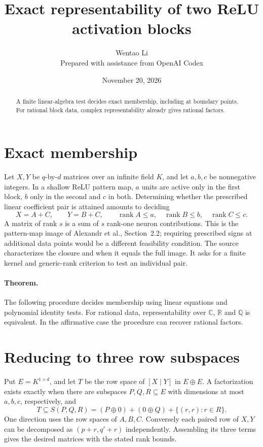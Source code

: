 \documentclass[11pt]{article}
\title{Exact representability of two ReLU activation blocks}
\author{Wentao Li\\{\small Prepared with assistance from OpenAI Codex}}
\date{November 20, 2026}
\begin{document}
\maketitle
\begin{abstract}
A finite linear-algebra test decides exact membership, including at boundary points. For rational block data, complex representability already gives rational factors.
\end{abstract}
\section*{Exact membership}
Let $X,Y$ be $q$-by-$d$ matrices over an infinite field $K$, and let $a,b,c$ be nonnegative integers. In a shallow ReLU pattern map, $a$ units are active only in the first block, $b$ only in the second and $c$ in both. Determining whether the prescribed linear coefficient pair is attained amounts to deciding
\[
 X=A+C,\qquad Y=B+C,\qquad
 \operatorname{rank} A\le a,\quad\operatorname{rank} B\le b,\quad\operatorname{rank} C\le c.
\]
A matrix of rank $s$ is a sum of $s$ rank-one neuron contributions. This is the pattern-map image of Alexandr et al., Section~2.2; requiring prescribed signs at additional data points would be a different feasibility condition. The source characterizes the closure and when it equals the full image. It asks for a finite kernel and generic-rank criterion to test an individual pair.

\paragraph{Theorem.} The following procedure decides membership using linear equations and polynomial identity tests. For rational data, representability over $\mathbb C$, $\mathbb R$ and $\mathbb Q$ is equivalent. In the affirmative case the procedure can recover rational factors.

\section*{Reducing to three row subspaces}
Put $E=K^{1\times d}$, and let $T$ be the row space of $[X\mid Y]$ in $E\oplus E$. A factorization exists exactly when there are subspaces $P,Q,R\subseteq E$ with dimensions at most $a,b,c$, respectively, and
\[
 T\subseteq S(P,Q,R)=(P\oplus0)+(0\oplus Q)+\{(r,r):r\in R\}.
\]
One direction uses the row spaces of $A,B,C$. Conversely each paired row of $X,Y$ can be decomposed as $(p+r,q'+r)$ independently. Assembling its three terms gives the desired matrices with the stated rank bounds.
\end{document}
